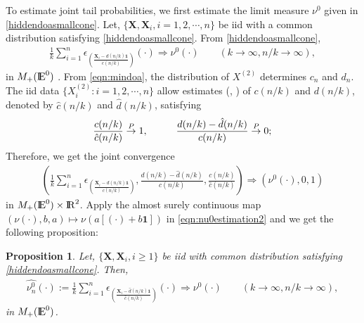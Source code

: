 \documentclass[11 pt]{amsart}
\newtheorem{prop}[thm]{Proposition}
\numberwithin{equation}{section}
\begin{document}
{To estimate joint tail probabilities, we  first estimate the
limit measure $\nu^0$ given in \eqref{hiddendoasmallcone}. Let, $\{
{\boldsymbol X}, {\boldsymbol X}_i, i = 1, 2, \cdots, n \}$ be iid {with a common
  distribution satisfying  \eqref{hiddendoasmallcone}.}
From
\eqref{hiddendoasmallcone}, 
\begin{align}\label{eqn:nu0estimation1}
\frac{1}{k} \sum_{i=1}^n \epsilon_{\left( \frac{{\boldsymbol X}_i -
      d(n/k){\boldsymbol 1}}{c(n/k)}\right)}(\cdot)
\Rightarrow \nu^0(\cdot)  \qquad (k \to \infty, n/k \to
\infty),
\end{align}
{i}n $M_+({\mathop{\rm I\kern -0.20em E}\nolimits}^0)$ \citep[page 139]{resnickbook:2007}. From
\eqref{eqn:mindoa},
the distribution of $X^{(2)}$ {determines} $c_n$ and $d_n$. 
The iid data $\{ X^{(2)}_i: i = 1, 2, \cdots, n \}$ {allow}
estimates  (\citep{dehaan:ferreira:2006}, \citep[page 93]{resnickbook:2007}) 
of $c(n/k)$ and $d(n/k)$, denoted by $\hat c(n/k)$ and $\hat
d(n/k)$, satisfying
\begin{align}\label{eqn:an0bn0 convergence}
\frac{c(n/k)}{\hat c(n/k)} \stackrel{P}{\rightarrow} 1, \hskip 1 cm \frac{d(n/k) - \hat d(n/k)}{c(n/k)} \stackrel{P}{\rightarrow} 0;
\end{align}
Therefore, we get the joint convergence
\begin{align}\label{eqn:nu0estimation2}
\left( \frac{1}{k} \sum_{i=1}^n \epsilon_{\left( \frac{{\boldsymbol X}_i -
        d(n/k){\boldsymbol 1}}{c(n/k)}\right)},
  \frac{d(n/k) - \hat d(n/k)}{c(n/k)}, \frac{c(n/k)}{\hat c(n/k)}
\right) \Rightarrow \left( \nu^0(\cdot), 0, 1 \right)  
\end{align}
{i}n $M_+({\mathop{\rm I\kern -0.20em E}\nolimits}^0) \times {\mathop{\rm I\kern -0.20em R}\nolimits}^2$. {Apply} the almost surely
continuous map $(\nu(\cdot), b, a) \mapsto \nu(a [ (\cdot) +
b{\boldsymbol 1}] )$ in \eqref{eqn:nu0estimation2}  {and} we get the following proposition:

\begin{prop}\label{prop:nonparametric estimation} 
{{ Let, $\{ {\boldsymbol X}, {\boldsymbol X}_i, i \geq 1\}$ be iid with common distribution satisfying
    \eqref{hiddendoasmallcone}. Then, 
\begin{align}\label{eqn:n0estimate}
\widehat{ \nu_n^0 }(\cdot):= \frac{1}{k} \sum_{i=1}^n \epsilon_{\left( \frac{{\boldsymbol X}_i - \hat
      d(n/k){\boldsymbol 1}}{\hat c(n/k)}\right)}(\cdot) \Rightarrow \nu^0(\cdot) \qquad (k \to
\infty, n/k \to     \infty),
\end{align}
{i}n $M_+({\mathop{\rm I\kern -0.20em E}\nolimits}^0)$.
}}
\end{prop}

}
\end{document}
